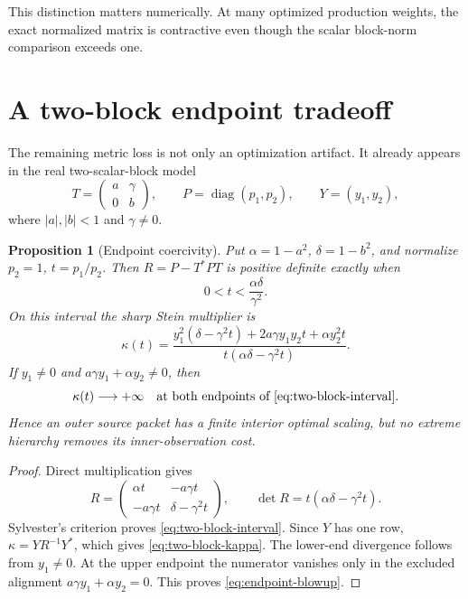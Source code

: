 \documentclass[11pt]{article}
\newtheorem{proposition}[theorem]{Proposition}
\theoremstyle{remark}
\newcommand{\diag}{\operatorname{diag}}
\begin{document}
This distinction matters numerically.  At many optimized production
weights, the exact normalized matrix is contractive even though the scalar
block-norm comparison exceeds one.

\section{A two-block endpoint tradeoff}
\label{sec:tradeoff}

The remaining metric loss is not only an optimization artifact.  It already
appears in the real two-scalar-block model
\begin{equation}
 T=\begin{pmatrix}a&\gamma\\0&b\end{pmatrix},
 \qquad P=\diag(p_1,p_2),
 \qquad Y=(y_1,y_2),
 \label{eq:two-block}
\end{equation}
where $|a|,|b|<1$ and $\gamma\ne0$.

\begin{proposition}[Endpoint coercivity]
\label{prop:two-block}
Put $\alpha=1-a^2$, $\delta=1-b^2$, and normalize $p_2=1$,
$t=p_1/p_2$.  Then $R=P-T^*PT$ is positive definite exactly when
\begin{equation}
 0<t<\frac{\alpha\delta}{\gamma^2}.
 \label{eq:two-block-interval}
\end{equation}
On this interval the sharp Stein multiplier is
\begin{equation}
 \kappa(t)
 =\frac{
 y_1^2(\delta-\gamma^2t)
 +2a\gamma y_1y_2t
 +\alpha y_2^2t}
 {t(\alpha\delta-\gamma^2t)}.
 \label{eq:two-block-kappa}
\end{equation}
If $y_1\ne0$ and $a\gamma y_1+\alpha y_2\ne0$, then
\begin{equation}
 \kappa(t)\longrightarrow+\infty
 \quad\text{at both endpoints of \eqref{eq:two-block-interval}}.
 \label{eq:endpoint-blowup}
\end{equation}
Hence an outer source packet has a finite interior optimal scaling, but no
extreme hierarchy removes its inner-observation cost.
\end{proposition}

\begin{proof}
Direct multiplication gives
\[
 R=\begin{pmatrix}
 \alpha t&-a\gamma t\\
 -a\gamma t&\delta-\gamma^2t
 \end{pmatrix},
 \qquad
 \det R=t(\alpha\delta-\gamma^2t).
\]
Sylvester's criterion proves \eqref{eq:two-block-interval}.  Since $Y$ has
one row, $\kappa=YR^{-1}Y^*$, which gives
\eqref{eq:two-block-kappa}.  The lower-end divergence follows from
$y_1\ne0$.  At the upper endpoint the numerator vanishes only in the
excluded alignment $a\gamma y_1+\alpha y_2=0$.  This proves
\eqref{eq:endpoint-blowup}.
\end{proof}
\end{document}
